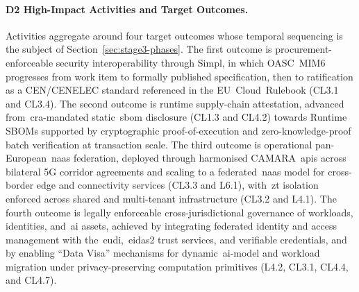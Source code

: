 \documentclass{ieeeaccess}
\begin{document}
\paragraph{D2 High-Impact Activities and Target Outcomes.}
Activities aggregate around four target outcomes whose temporal sequencing is the subject of Section~\ref{sec:stage3-phases}. The first outcome is procurement-enforceable security interoperability through Simpl, in which OASC~MIM6 progresses from work item to formally published specification, then to ratification as a CEN/CENELEC standard referenced in the EU~Cloud~Rulebook (CL3.1 and CL3.4). The second outcome is runtime supply-chain attestation, advanced from~\gls{cra}-mandated static~\gls{sbom} disclosure (CL1.3 and CL4.2) towards Runtime SBOMs supported by cryptographic proof-of-execution and zero-knowledge-proof batch verification at transaction scale. The third outcome is operational pan-European~\gls{naas} federation, deployed through harmonised CAMARA~\glspl{api} across bilateral 5G corridor agreements and scaling to a federated~\gls{naas} model for cross-border edge and connectivity services (CL3.3 and L6.1), with~\gls{zt} isolation enforced across shared and multi-tenant infrastructure (CL3.2 and L4.1). The fourth outcome is legally enforceable cross-jurisdictional governance of workloads, identities, and~\gls{ai} assets, achieved by integrating federated identity and access management with the~\gls{eudi},~\gls{eidas2} trust services, and verifiable credentials, and by enabling ``Data Visa'' mechanisms for dynamic~\gls{ai}-model and workload migration under privacy-preserving computation primitives (L4.2, CL3.1, CL4.4, and CL4.7).
\end{document}
